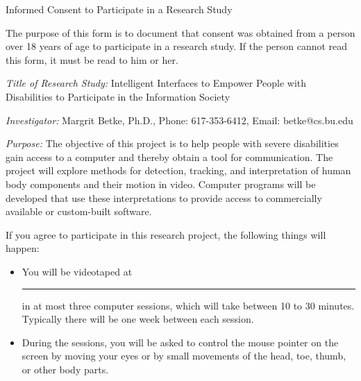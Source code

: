 \setlength{\textheight}{9.5in}
\setlength{\footheight}{0.0in}
\setlength{\topmargin}{0in}   %
\setlength{\headheight}{0.0in}
\setlength{\headsep}{0.0in}
\setlength{\textwidth}{6.6in}
\setlength{\oddsidemargin}{0in}
\setlength{\parindent}{0pc}
\setlength{\parskip}{6pt plus 1.5pt minus 1.5pt}


\signature{\vspace*{-.7cm} Margrit Betke,\\ Assistant Professor}


\pagestyle{empty}

\begin{letter}

\centerline{\Large Informed Consent to Participate in a Research Study }

The purpose of this form is to document that consent was obtained from
a person over 18 years of age to participate in a research study.  If
the person cannot read this form, it must be read to him or her.

{\em Title of Research Study:}
Intelligent Interfaces to Empower People with Disabilities to
Participate in the Information Society


{\em Investigator:} Margrit Betke, Ph.D., Phone: 617-353-6412, Email:
betke@cs.bu.edu

{\em Purpose:} The objective of this project is to help people with
severe disabilities gain access to a computer and thereby obtain a
tool for communication.  The project will explore methods for
detection, tracking, and interpretation of human body components and
their motion in video.  Computer programs will be developed that use
these interpretations to provide access to commercially available or
custom-built software.

If you agree to participate in this research project, the following
things will happen:

\begin{itemize}
\item You will be videotaped at  \rule{3cm}{.01cm} in at most three computer
sessions, which will take between 10 to 30 minutes.  Typically there
will be one week between each session.

\item During the sessions, you will be asked to control the mouse
pointer on the screen by moving your eyes or by small movements of the
head, toe, thumb, or other body parts.


\end{itemize}
\end{letter}
